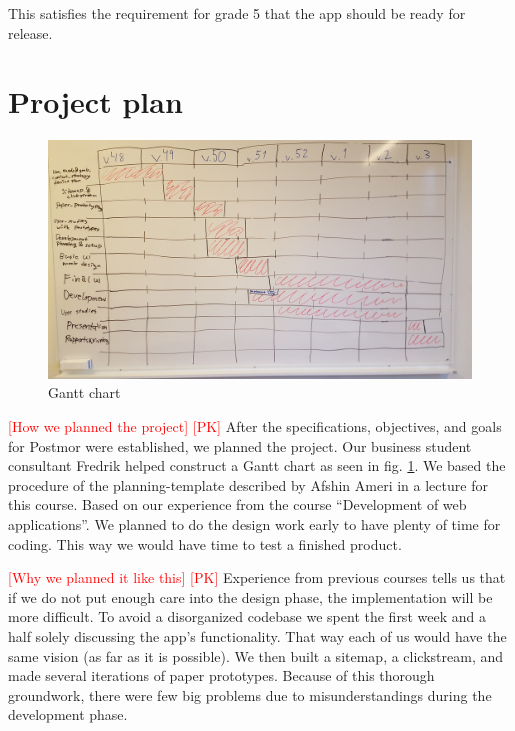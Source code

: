 \documentclass[acmlarge, review=false, screen=true]{acmart}
\begin{document}
    This satisfies the requirement for grade 5 that the app should be ready for release.

  \section{Project plan}
      \begin{figure}
      \includegraphics[width=\textwidth]{images/Gantt_schema.jpg}
      \caption{Gantt chart}
      \label{fig:gantt}
    \end{figure} 
    \textcolor{red}{[How we planned the project] [PK]} \newline
    After the specifications, objectives, and goals for Postmor were established, we planned the project. Our business student consultant Fredrik helped construct a Gantt chart\cite{gantt} as seen in fig. \ref{fig:gantt}. We based the procedure of the planning-template described by Afshin Ameri in a lecture for this course\cite{lecturenotes-mobile}. Based on our experience from the course “Development of web applications”. We planned to do the design work early to have plenty of time for coding. This way we would have time to test a finished product.

    \textcolor{red}{[Why we planned it like this] [PK]} \newline
    Experience from previous courses tells us that if we do not put enough care into the design phase, the implementation will be more difficult. To avoid a disorganized codebase we spent the first week and a half solely discussing the app’s functionality. That way each of us would have the same vision (as far as it is possible). We then built a sitemap, a clickstream, and made several iterations of paper prototypes\cite{lecturenotes-mobile}. Because of this thorough groundwork, there were few big problems due to misunderstandings during the development phase.
\end{document}
